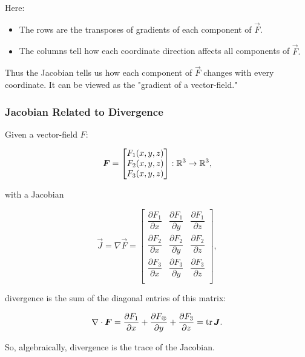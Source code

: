 \documentclass{article}
\begin{document}
\begin{remark}
Here:

\begin{itemize}
\item The \@{rows} are the \@{transposes} of \@{gradients} of each \@{component} of $\vec{F}.$
\end{itemize}

\begin{itemize}
\item The \@{columns} tell how each \@{coordinate} \@{direction} affects all \@{components} of $\vec{F}.$
\end{itemize}

Thus the \@{Jacobian} tells us how each \@{component} of $\vec{F}$ changes with every \@{coordinate}. It can be viewed as the "\@{gradient} of a \@{vector-field}."
\end{remark}

\subsubsection{Jacobian Related to Divergence}

Given a \@{vector-field} $F:$

\[ \boldsymbol{F} = \begin{bmatrix}
  F_1(x,y,z) \\  
  F_2(x,y,z) \\
  F_3(x,y,z) \\   
\end{bmatrix} : \mathbb{R}^3 \to \mathbb{R}^3, \]

with a \@{Jacobian}

\[ \vec{J} = \nabla \vec{F} =  
\begin{bmatrix}
    \dfrac{\partial F_1}{\partial x} & \dfrac{\partial F_1}{\partial y} & \dfrac{\partial F_1}{\partial z}\\
    \dfrac{\partial F_2}{\partial x} & \dfrac{\partial F_2}{\partial y} & \dfrac{\partial F_2}{\partial z}\\
    \dfrac{\partial F_3}{\partial x} & \dfrac{\partial F_3}{\partial y} & \dfrac{\partial F_3}{\partial z}\\
\end{bmatrix}, \]

\@{divergence} is the \@{sum} of the \@{diagonal} \@{entries} of this \@{matrix}:

\[ \nabla \cdot \boldsymbol{F} = \dfrac{\partial F_1}{\partial x} + \dfrac{\partial F_@}{\partial y} + \dfrac{\partial F_3}{\partial z} = \operatorname{tr}{\boldsymbol{J}}. \]

So, algebraically, \@{divergence} is the \@{trace} of the \@{Jacobian}.
\end{document}
